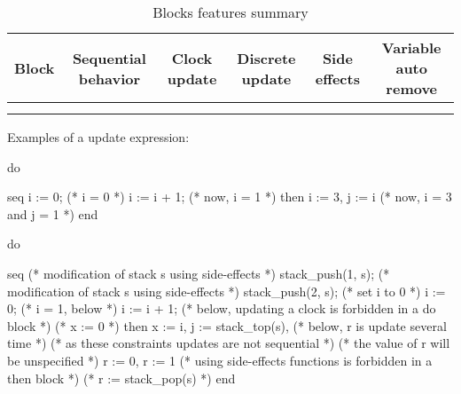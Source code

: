 \begin{table}[tb]
	\caption{Blocks features summary}
	{\centering
	\small
	\setlength{\tabcolsep}{2pt} %
		\begin{tabular}{ | l | c | c | c | c | c | }
			\hline
			\rowHeader{} \textbf{Block} & \textbf{Sequential behavior} & \textbf{Clock update} & \textbf{Discrete update} & \textbf{Side effects} & \textbf{Variable auto remove} \\
			\hline
			\styleIMI{seq} & \cellYes{} & \cellNo{} & \cellYes{} & \cellYes{} & \cellNo{}        \\
			\hline
			\styleIMI{then} & \cellNo{} & \cellYes{} & \cellYes{} & \cellNo{} & \cellYes{}        \\
			\hline
		\end{tabular}

	}

	\label{table:summary:blocks-characteristics}
\end{table}

Examples of a  update expression:

\begin{IMITATORmodel}
	do {

		seq
			i := 0; (* i = 0 *)
			i := i + 1; (* now, i = 1 *)
		then
			i := 3, j := i (* now, i = 3 and j = 1 *)
		end

	}
\end{IMITATORmodel}

\begin{IMITATORmodel}
	do {

		seq
			(* modification of stack s using side-effects *)
			stack_push(1, s);
			(* modification of stack s using side-effects *)
			stack_push(2, s);
			(* set i to 0 *)
			i := 0;
			(* i = 1, below *)
			i := i + 1;
			(* below, updating a clock is forbidden in a do block *)
			(* x := 0 *)
		then
			x := i,
			j := stack_top(s),
			(* below, r is update several time *)
			(* as these constraints updates are not sequential *)
			(* the value of r will be unspecified *)
			r := 0,
			r := 1
			(* using side-effects functions is forbidden in a then block *)
			(* r := stack_pop(s) *)
		end

	}
\end{IMITATORmodel}

